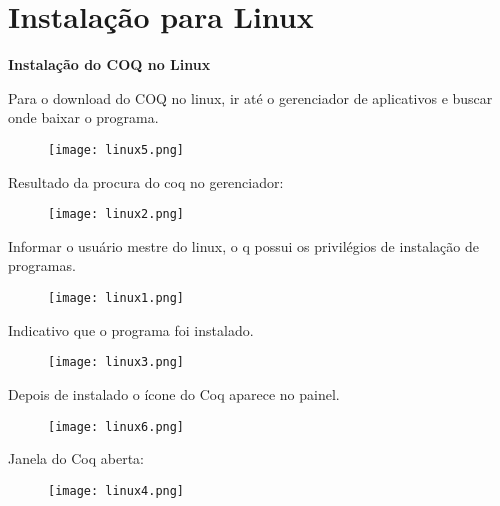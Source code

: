 \section{Instala\c{c}\~ao para Linux}
\begin{center}
{\textbf {Instala\c{c}\~{a}o do COQ no Linux }}\\
\end{center}
Para o download do COQ  no linux, ir at\'{e} o gerenciador de aplicativos e buscar onde baixar o programa.\\
\begin{figure}[!htb]
\texttt{[image: linux5.png]} 
\end{figure}
Resultado da procura do coq no gerenciador:\\
\begin{figure}[!htb]
\texttt{[image: linux2.png]} 
\end{figure}
Informar o usu\'{a}rio mestre do linux, o q possui os privil\'{e}gios de instala\c{c}\~{a}o de programas.\\
\begin{figure}[!htb]
\texttt{[image: linux1.png]} 
\end{figure}
Indicativo que o programa foi instalado.\\
\begin{figure}[!htb]
\texttt{[image: linux3.png]} 
\end{figure}
Depois de instalado o \'{i}cone do Coq aparece no painel.\\
\begin{figure}[!htb]
\texttt{[image: linux6.png]}
\end{figure}
Janela do Coq aberta:\\
\begin{figure}[!htb]
\texttt{[image: linux4.png]}
\end{figure}